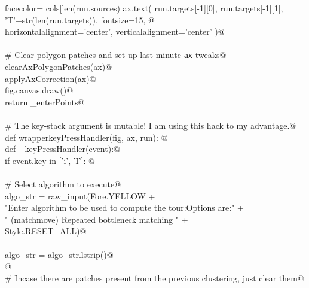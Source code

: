 \documentclass[10pt, english, oneside]{report}
\begin{document}
\begin{appendices}
\begin{flushleft}
\begin{list}{}{}
\mbox{}\verb@                                                       facecolor= cols[len(run.sources)%len(cols)], edgecolor='black', lw=1.0 ))@\\
\mbox{}\verb@                      ax.text( run.targets[-1][0], run.targets[-1][1], 'T'+str(len(run.targets)), fontsize=15, @\\
\mbox{}\verb@                               horizontalalignment='center', verticalalignment='center' )@\\
\mbox{}\verb@@\\
\mbox{}\verb@             # Clear polygon patches and set up last minute \verb|ax| tweaks@\\
\mbox{}\verb@             clearAxPolygonPatches(ax)@\\
\mbox{}\verb@             applyAxCorrection(ax)@\\
\mbox{}\verb@             fig.canvas.draw()@\\
\mbox{}\verb@      return _enterPoints@\\
\mbox{}\verb@@\\
\mbox{}\verb@    # The key-stack argument is mutable! I am using this hack to my advantage.@\\
\mbox{}\verb@    def wrapperkeyPressHandler(fig, ax, run): @\\
\mbox{}\verb@           def _keyPressHandler(event):@\\
\mbox{}\verb@               if event.key in ['i', 'I']:  @\\
\mbox{}\verb@@\\
\mbox{}\verb@                    # Select algorithm to execute@\\
\mbox{}\verb@                    algo_str = raw_input(Fore.YELLOW                                             +\@\\
\mbox{}\verb@                            "Enter algorithm to be used to compute the tour:\n Options are:\n"   +\@\\
\mbox{}\verb@                            " (matchmove)     Repeated bottleneck matching \n"                            +\@\\
\mbox{}\verb@                            Style.RESET_ALL)@\\
\mbox{}\verb@@\\
\mbox{}\verb@                    algo_str = algo_str.lstrip()@\\
\mbox{}\verb@                     @\\
\mbox{}\verb@                    # Incase there are patches present from the previous clustering, just clear them@\\

\end{list}
\end{flushleft}
\end{appendices}
\end{document}
